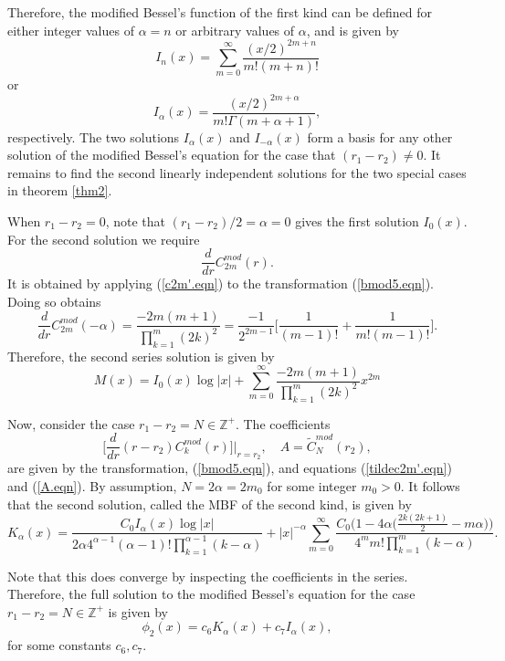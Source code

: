 \documentclass[12pt]{article}
\theoremstyle{definition}
\numberwithin{equation}{section}
\begin{document}
{Therefore, the modified Bessel's function of the first kind can be defined for either integer values of $\alpha=n$ or arbitrary values of $\alpha$, and is given by
\begin{equation}
I_n(x)=\sum_{m=0}^\infty\frac{(x\slash 2)^{2m+n}}{m!(m+n)!}
\end{equation}
or
\begin{equation}
I_\alpha(x)=\frac{(x\slash 2)^{2m+\alpha}}{m!\Gamma(m+\alpha+1)},
\end{equation}
respectively. The two solutions $I_\alpha(x)$ and $I_{-\alpha}(x)$ form a basis for any other solution of the modified Bessel's equation for the case that $(r_1-r_2)\neq 0$. It remains to find the second linearly independent solutions for the two special cases in theorem \ref{thm2}.

When $r_1-r_2=0$, note that $(r_1-r_2)\slash 2=\alpha=0$ gives the first solution $I_0(x)$. For the second solution we require
$$\frac{d}{dr}C_{2m}^{mod}(r).$$
It is obtained by applying (\ref{c2m'.eqn}) to the transformation (\ref{bmod5.eqn}). Doing so obtains
\begin{equation}
\frac{d}{dr}C_{2m}^{mod}(-\alpha)=\frac{-2m(m+1)}{\prod_{k=1}^m(2k)^2}=\frac{-1}{2^{2m-1}}\bigg[\frac{1}{(m-1)!}+\frac{1}{m!(m-1)!}\bigg].
\label{bmod8.eqn}
\end{equation}
Therefore, the second series solution is given by
\begin{equation}
M(x)=I_0(x)\log{|x|}+\sum_{m=0}^\infty \frac{-2m(m+1)}{\prod_{k=1}^m 
(2k)^2}x^{2m}
\label{bmod9.eqn}
\end{equation}

Now, consider the case $r_1-r_2=N\in\mathbb{Z}^{+}$. The coefficients
$$\bigg[\frac{d}{dr}(r-r_2)C_k^{mod}(r)\bigg]\bigg|_{r=r_2},\quad A= \tilde{C}_N^{mod}(r_2),$$
are given by the transformation, (\ref{bmod5.eqn}), and equations (\ref{tildec2m'.eqn}) and (\ref{A.eqn}). By assumption, $N=2\alpha=2m_0$ for some integer $m_0>0$. It follows that the second solution, called the MBF of the second kind, is given by
\begin{equation}
K_\alpha(x)=\frac{C_0I_\alpha(x)\log{|x|}}{2\alpha 4^{\alpha-1}(\alpha-1)!\prod_{k=1}^{\alpha-1}(k-\alpha)}+|x|^{-\alpha}\sum_{m=0}^\infty\frac{C_0\Big(1-4\alpha\big(\frac{2k(2k+1)}{2}-m\alpha\big)\Big)}{4^mm!\prod_{k=1}^m(k-\alpha)}.
\end{equation}

Note that this does converge by inspecting the coefficients in the series. Therefore, the full solution to the modified Bessel's equation for the case $r_1-r_2=N\in\mathbb{Z}^{+}$ is given by
$$\phi_2(x)=c_6K_\alpha(x)+c_7I_\alpha(x),$$
for some constants $c_6,c_7$.
}
\end{document}
